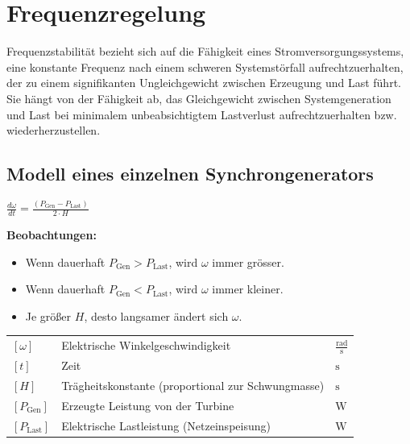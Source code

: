 \section{Frequenzregelung}
    Frequenzstabilität bezieht sich auf die Fähigkeit eines Stromversorgungssystems, 
    eine konstante Frequenz nach einem schweren Systemstörfall aufrechtzuerhalten, 
    der zu einem signifikanten Ungleichgewicht zwischen Erzeugung und Last führt. 
    Sie hängt von der Fähigkeit ab, das Gleichgewicht zwischen Systemgeneration 
    und Last bei minimalem unbeabsichtigtem Lastverlust aufrechtzuerhalten bzw. wiederherzustellen.

\subsection{Modell eines einzelnen Synchrongenerators}
    \begin{minipage}[t]{0.35\columnwidth}
        \centering \vspace{-0.7\baselineskip}
        $\boxed{\frac{d\omega}{dt} = \frac{(P_{\text{Gen}} - P_{\text{Last}})}{2 \cdot H} }$
    \end{minipage}%
    \hfill
    \begin{minipage}[t]{0.64\columnwidth}
        \textbf{Beobachtungen:}
        \begin{itemize}
            \item Wenn dauerhaft \( P_\mathrm{Gen} > P_\mathrm{Last} \), wird \(\omega\) immer grösser.
            \item Wenn dauerhaft \( P_\mathrm{Gen} < P_\mathrm{Last} \), wird \(\omega\) immer kleiner.
            \item Je größer \( H \), desto langsamer ändert sich \(\omega\).
        \end{itemize}
    \end{minipage}

    \renewcommand{\arraystretch}{1.2}
    \begin{tabular}{@{} l p{7cm} l @{}}
        $[\omega]$            & Elektrische Winkelgeschwindigkeit \dotfill       & $\frac{\text{rad}}{\text{s}}$ \\
        $[t]$                 & Zeit \dotfill                                    & $\text{s}$ \\
        $[H]$                 & Trägheitskonstante (proportional zur Schwungmasse) \dotfill & $\text{s}$ \\
        $[P_{\text{Gen}}]$    & Erzeugte Leistung von der Turbine \dotfill       & $\text{W}$ \\
        $[P_{\text{Last}}]$   & Elektrische Lastleistung (Netzeinspeisung) \dotfill & $\text{W}$ \\
    \end{tabular}


